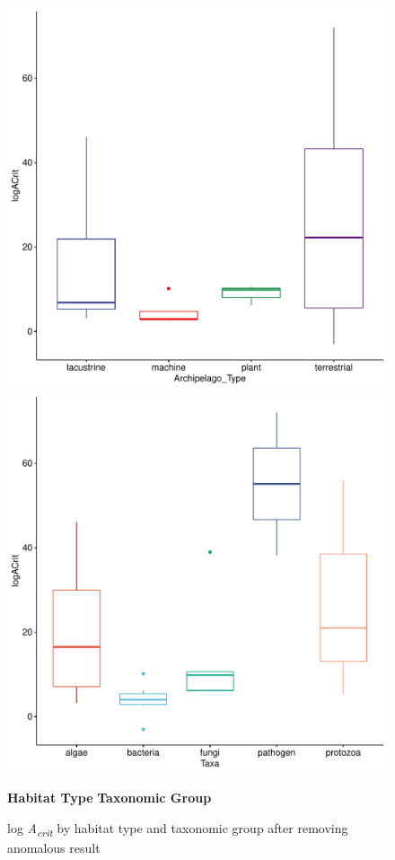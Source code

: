 {{\begin{figure}[htp]
\centering
\includegraphics[width=.5\textwidth]{BoxplotTotalACritArch.pdf}\hfill
\includegraphics[width=.5\textwidth]{BoxplotTotalACritTaxa.pdf}\hfill

\hspace{10pt}\textbf{Habitat Type} \hspace{110pt} \textbf{Taxonomic Group}

\caption{log \textit{A\textsubscript{crit}} by habitat type and taxonomic group after removing anomalous result}
\label{fig:figure8}

\end{figure}


}

}
